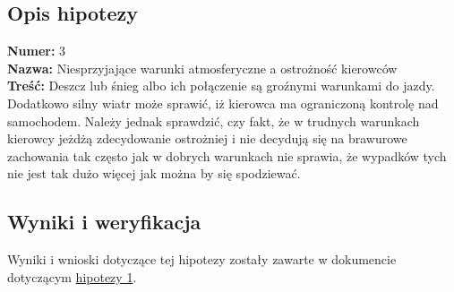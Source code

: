 \subsection{Opis hipotezy}\label{opis-hipotezy}

\textbf{Numer:} 3\\\textbf{Nazwa:} Niesprzyjające warunki atmosferyczne
a ostrożność kierowców\\\textbf{Treść:} Deszcz lub śnieg albo ich
połączenie są groźnymi warunkami do jazdy. Dodatkowo silny wiatr może
sprawić, iż kierowca ma ograniczoną kontrolę nad samochodem. Należy
jednak sprawdzić, czy fakt, że w trudnych warunkach kierowcy jeżdżą
zdecydowanie ostrożniej i nie decydują się na brawurowe zachowania tak
często jak w dobrych warunkach nie sprawia, że wypadków tych nie jest
tak dużo więcej jak można by się spodziewać.

\subsection{Wyniki i weryfikacja}\label{wyniki-i-weryfikacja}

Wyniki i wnioski dotyczące tej hipotezy zostały zawarte w dokumencie
dotyczącym \href{Hipoteza-1}{hipotezy 1}.

